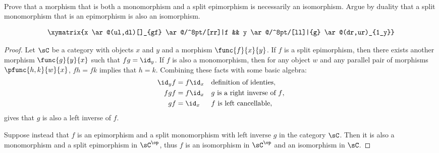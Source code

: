 \documentclass[main.tex]{subfiles}
\begin{document}
\paragraph{}
\begin{exercise}
	Prove that a morphism that is both a monomorphism and a split epimorphism is
	necessarily an isomorphism. Argue by duality that a split monomorphism that
	is an epimorphism is also an isomorphism.
\end{exercise}
	\[\xymatrix{x \ar@(ul,dl)[]_{gf} \ar@/^8pt/[rr]|f && y \ar@/^8pt/[ll]|{g} \ar@(dr,ur)_{1_y}}\]
\begin{proof}
	Let \(\sC\) be a category with objects \(x\) and \(y\) and a morphism
	\(\func{f}{x}{y}\). If \(f\) is a split epimorphism, then there exists
	another morphism \(\func{g}{y}{x}\) such that \(fg=\id_y\). If \(f\) is also
	a monomorphism, then for any object \(w\) and any parallel pair of morphisms
	\(\pfunc{h,k}{w}{x}\), \(fh=fk\) implies that \(h=k\). Combining these facts
	with some basic algebra:
	\begin{align*}
		\id_yf&=f\id_x && \textrm{definition of identies}, \\
		fgf&=f\id_x && \textrm{\(g\) is a right inverse of \(f\)}, \\
		gf&=\id_x && \textrm{\(f\) is left cancellable},
	\end{align*}
	gives that \(g\) is also a left inverse of \(f\).

	Suppose instead that \(f\) is an epimorphism and a split monomorphism with
	left inverse \(g\) in the category \(\sC\). Then it is also a monomorphism
	and a split epimorphism in \(\sC^\op\), thus \(f\) is an isomorphism in
	\(\sC^\op\) and an isomorphism in \(\sC\).
\end{proof}
\end{document}
